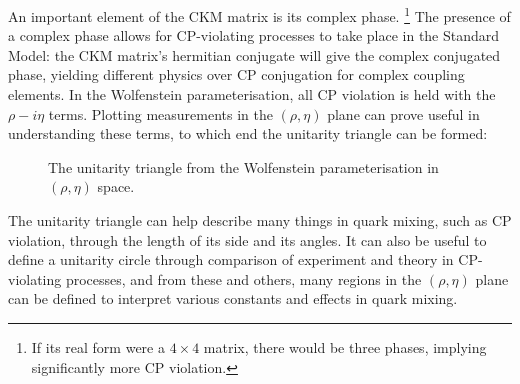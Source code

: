 \documentclass[a4paper,12pt]{article}
\begin{document}
An important element of the CKM matrix is its complex phase.
\hspace{-10pt}\footnote{If its real form were a $4\times4$ matrix, there would be three phases, implying significantly more CP violation.}
\hspace{-5pt}The presence of a complex phase allows for CP-violating processes to take place in the Standard Model: the CKM matrix's hermitian conjugate will give the complex conjugated phase, yielding different physics over CP conjugation for complex coupling elements. 
In the Wolfenstein parameterisation, all CP violation is held with the $\rho-i\eta$ terms. 
Plotting measurements in the $(\rho,\eta)$ plane can prove useful in understanding these terms, to which end the unitarity triangle can be formed:
\begin{figure}[H]
    \centering
    \caption{\label{fig:unitang} The unitarity triangle from the Wolfenstein parameterisation in $(\rho,\eta)$ space.}
\end{figure}
The unitarity triangle can help describe many things in quark mixing, such as CP violation, through the length of its side and its angles. 
It can also be useful to define a unitarity circle through comparison of experiment and theory in CP-violating processes, and from these and others, many regions in the $(\rho,\eta)$ plane can be defined to interpret various constants and effects in quark mixing. 
\end{document}
